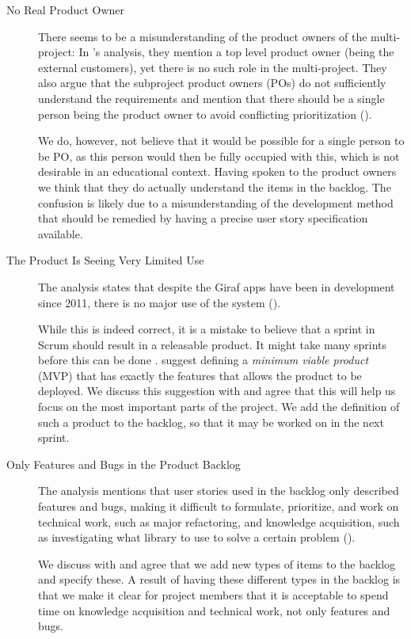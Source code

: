 \begin{description}
  \item[No Real Product Owner] There seems to be a misunderstanding of the product owners of the multi-project: In 's analysis, they mention a top level product owner (being the external customers), yet there is no such role in the multi-project. They also argue that the subproject product owners (POs) do not sufficiently understand the requirements and mention that there should be a single person being the product owner to avoid conflicting prioritization ().

We do, however, not believe that it would be possible for a single person to be PO, as this person would then be fully occupied with this, which is not desirable in an educational context. Having spoken to the product owners we think that they do actually understand the items in the backlog. The confusion is likely due to a misunderstanding of the development method that should be remedied by having a precise user story specification available.
  \item[The Product Is Seeing Very Limited Use] The analysis states that despite the Giraf apps have been in development since 2011, there is no major use of the system ().

While this is indeed correct, it is a mistake to believe that a sprint in Scrum should result in a releasable product. It might take many sprints before this can be done \parencite{larman2003}.  suggest defining a \emph{minimum viable product} (MVP) that has exactly the features that allows the product to be deployed. We discuss this suggestion with  and agree that this will help us focus on the most important parts of the project. We add the definition of such a product to the backlog, so that it may be worked on in the next sprint.
  \item[Only Features and Bugs in the Product Backlog] The analysis mentions that user stories used in the backlog only described features and bugs, making it difficult to formulate, prioritize, and work on technical work, such as major refactoring, and knowledge acquisition, such as investigating what library to use to solve a certain problem ().

We discuss with  and agree that we add new types of items to the backlog and specify these. A result of having these different types in the backlog is that we make it clear for project members that it is acceptable to spend time on knowledge acquisition and technical work, not only features and bugs.
\end{description}

